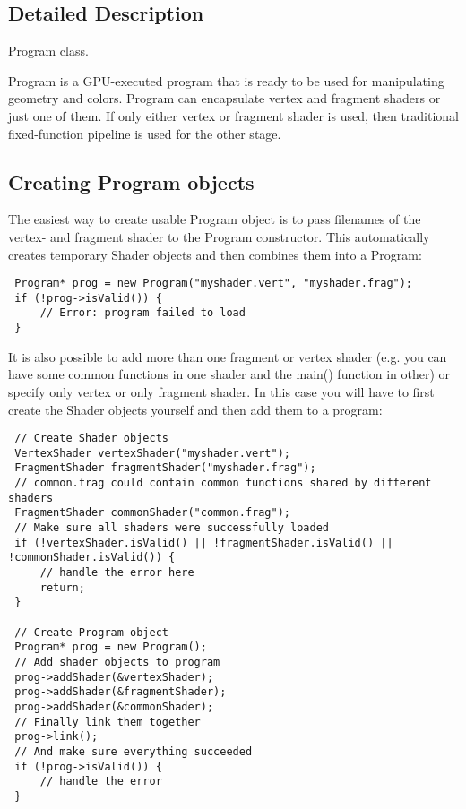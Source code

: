 \subsection{Detailed Description}
Program class. 

Program is a GPU-executed program that is ready to be used for manipulating geometry and colors. Program can encapsulate vertex and fragment shaders or just one of them. If only either vertex or fragment shader is used, then traditional fixed-function pipeline is used for the other stage.\hypertarget{class_k_g_l_program_creating}{}\subsection{Creating Program objects}\label{class_k_g_l_program_creating}
The easiest way to create usable Program object is to pass filenames of the vertex- and fragment shader to the Program constructor. This automatically creates temporary Shader objects and then combines them into a Program: 

\begin{Code}\begin{verbatim} Program* prog = new Program("myshader.vert", "myshader.frag");
 if (!prog->isValid()) {
     // Error: program failed to load
 }
\end{verbatim}
\end{Code}



It is also possible to add more than one fragment or vertex shader (e.g. you can have some common functions in one shader and the main() function in other) or specify only vertex or only fragment shader. In this case you will have to first create the Shader objects yourself and then add them to a program: 

\begin{Code}\begin{verbatim} // Create Shader objects
 VertexShader vertexShader("myshader.vert");
 FragmentShader fragmentShader("myshader.frag");
 // common.frag could contain common functions shared by different shaders
 FragmentShader commonShader("common.frag");
 // Make sure all shaders were successfully loaded
 if (!vertexShader.isValid() || !fragmentShader.isValid() || !commonShader.isValid()) {
     // handle the error here
     return;
 }

 // Create Program object
 Program* prog = new Program();
 // Add shader objects to program
 prog->addShader(&vertexShader);
 prog->addShader(&fragmentShader);
 prog->addShader(&commonShader);
 // Finally link them together
 prog->link();
 // And make sure everything succeeded
 if (!prog->isValid()) {
     // handle the error
 }
\end{verbatim}
\end{Code}

